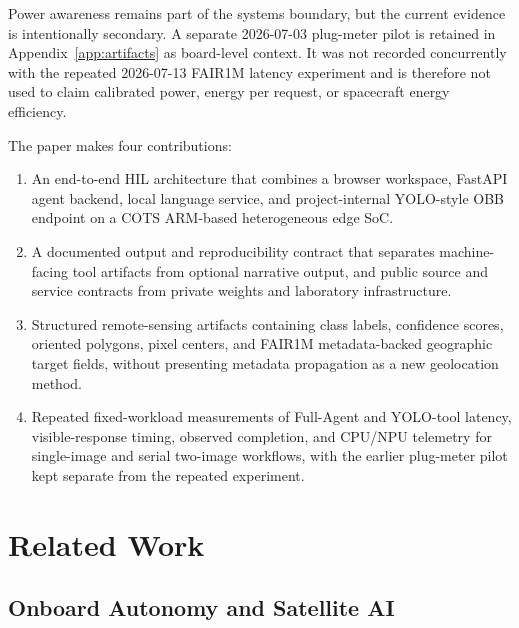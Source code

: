 \documentclass[10pt,letterpaper]{article}
\begin{document}
Power awareness remains part of the systems boundary, but the current evidence is intentionally secondary. A separate 2026-07-03 plug-meter pilot is retained in Appendix~\ref{app:artifacts} as board-level context. It was not recorded concurrently with the repeated 2026-07-13 FAIR1M latency experiment and is therefore not used to claim calibrated power, energy per request, or spacecraft energy efficiency.

The paper makes four contributions:
\begin{enumerate}
    \item An end-to-end HIL architecture that combines a browser workspace, FastAPI agent backend, local language service, and project-internal YOLO-style OBB endpoint on a COTS ARM-based heterogeneous edge SoC.
    \item A documented output and reproducibility contract that separates machine-facing tool artifacts from optional narrative output, and public source and service contracts from private weights and laboratory infrastructure.
    \item Structured remote-sensing artifacts containing class labels, confidence scores, oriented polygons, pixel centers, and FAIR1M metadata-backed geographic target fields, without presenting metadata propagation as a new geolocation method.
    \item Repeated fixed-workload measurements of Full-Agent and YOLO-tool latency, visible-response timing, observed completion, and CPU/NPU telemetry for single-image and serial two-image workflows, with the earlier plug-meter pilot kept separate from the repeated experiment.
\end{enumerate}

\section{Related Work}

\subsection{Onboard Autonomy and Satellite AI}
\end{document}
